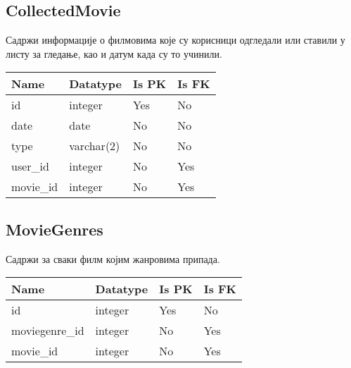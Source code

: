 \subsection{CollectedMovie}

Садржи информације о филмовима које су корисници одгледали или ставили у листу за гледање, као и датум када су то учинили.

\vspace{0.5cm}

\noindent
\setcellgapes{4pt}
\makegapedcells
\begin{tabularx}{\linewidth}{|X|X|X|X|}
    \hline
    \textbf{Name} & \textbf{Datatype} & \textbf{Is PK} & \textbf{Is FK} \\
    \hline
    id & integer & Yes & No \\
    \hline
    date & date & No & No \\
    \hline
    type & varchar(2) & No & No \\
    \hline
    user\_id & integer & No & Yes \\
    \hline
    movie\_id & integer & No & Yes \\
    \hline
\end{tabularx}

\subsection{MovieGenres}

Садржи за сваки филм којим жанровима припада.

\vspace{0.5cm}

\noindent
\setcellgapes{4pt}
\makegapedcells
\begin{tabularx}{\linewidth}{|X|X|X|X|}
    \hline
    \textbf{Name} & \textbf{Datatype} & \textbf{Is PK} & \textbf{Is FK} \\
    \hline
    id & integer & Yes & No \\
    \hline
    moviegenre\_id & integer & No & Yes \\
    \hline
    movie\_id & integer & No & Yes \\
    \hline
\end{tabularx}
